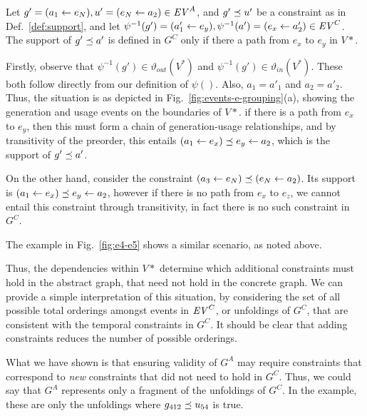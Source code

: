 \begin{proposition}
	Let $g' = (a_1 \leftarrow e_N), u' = (e_N \leftarrow a_2) \in \mathit{EV}^A$, and $g' \preceq u'$ be a constraint as in Def.~\ref{def:support}, and let 	
	$\psi^{-1}(g')  = (a'_1 \leftarrow e_y), \psi^{-1}(a') =  (e_x \leftarrow a'_2) \in \mathit{EV}^C$.
	The support of $g' \preceq a'$ is defined in $G^C$ only if there a path from $e_x$ to $e_y$ in $V*$.	
\end{proposition}

\begin{pf}

Firstly, observe that $\psi^{-1}(g') \in \vartheta_{out}(V^*) $ and $\psi^{-1}(g') \in \vartheta_{in}(V^*) $. 
These both follow directly from our definition of $\psi()$.
Also, $a_1 = a'_1$ and  $a_2 = a'_2$.
Thus, the situation is as depicted in Fig.~\ref{fig:events-e-grouping}(a), showing the generation and usage events on the boundaries of $V*$.
if there is a path from $e_x$ to $e_y$, then this must form a chain of generation-usage relationships, and by transitivity of the preorder, this entails $(a_1 \leftarrow e_x ) \preceq e_y \leftarrow a_2$, which is the support of $g' \preceq a'$.

On the other hand, consider the constraint $(a_3 \leftarrow e_N) \preceq (e_N \leftarrow a_2)$.
Its support is $(a_1 \leftarrow e_x ) \preceq e_y \leftarrow a_2$, however if there is no path from $e_x$ to $e_z$, we cannot entail this constraint through transitivity, in fact there is no such constraint in $G^C$.
\end{pf}

The example in Fig.~\ref{fig:e4-e5} shows a similar scenario, as noted above.

Thus, the dependencies within $V*$ determine which additional constraints must hold in the abstract graph, that need not hold in the concrete graph.
We can provide a simple interpretation of this situation, by considering the set of all possible total orderings amongst events in $\mathit{EV}^C$, or unfoldings of $G^C$, that are consistent with the temporal constraints in $G^C$.
It should be clear that adding constraints reduces the number of possible orderings. 

What we have shown is that ensuring validity of $G^A$ may require constraints that correspond to \textit{new} constraints that did not need to hold in $G^C$. 
Thus, we could say that $G^A$ represents only a fragment of the unfoldings of $G^C$. In the example, these are only the unfoldings where $g_{412} \preceq u_{54}$ is true.



